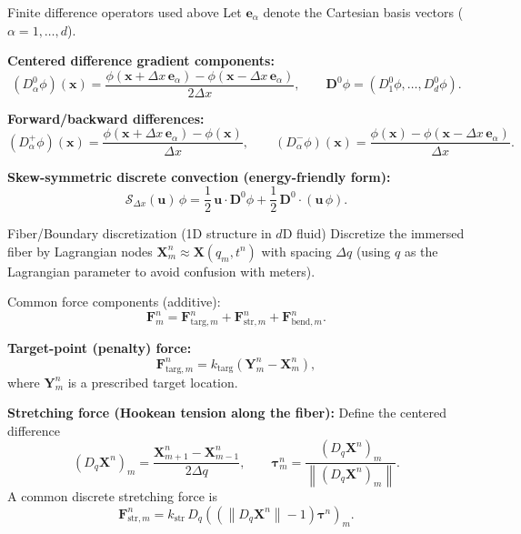 \documentclass{beamer}
\begin{document}
\begin{frame}{Finite difference operators used above}
\small
Let $\mathbf{e}_{\alpha}$ denote the Cartesian basis vectors ($\alpha=1,\dots,d$).

\medskip
\textbf{Centered difference gradient components:}
\[
\left(D_{\alpha}^{0}\phi\right)(\mathbf{x})
=
\frac{\phi(\mathbf{x}+\Delta x\,\mathbf{e}_{\alpha})-\phi(\mathbf{x}-\Delta x\,\mathbf{e}_{\alpha})}{2\Delta x},
\qquad
\mathbf{D}^{0}\phi = (D_{1}^{0}\phi,\dots,D_{d}^{0}\phi).
\]

\textbf{Forward/backward differences:}
\[
\left(D_{\alpha}^{+}\phi\right)(\mathbf{x})
=
\frac{\phi(\mathbf{x}+\Delta x\,\mathbf{e}_{\alpha})-\phi(\mathbf{x})}{\Delta x},
\qquad
\left(D_{\alpha}^{-}\phi\right)(\mathbf{x})
=
\frac{\phi(\mathbf{x})-\phi(\mathbf{x}-\Delta x\,\mathbf{e}_{\alpha})}{\Delta x}.
\]

\textbf{Skew-symmetric discrete convection (energy-friendly form):}
\[
\mathcal{S}_{\Delta x}(\mathbf{u})\,\phi
=
\frac{1}{2}\,\mathbf{u}\cdot \mathbf{D}^{0}\phi
+
\frac{1}{2}\,\mathbf{D}^{0}\cdot(\mathbf{u}\,\phi).
\]
\end{frame}

\begin{frame}{Fiber/Boundary discretization (1D structure in $d$D fluid)}
\small
Discretize the immersed fiber by Lagrangian nodes $\mathbf{X}^{n}_{m}\approx \mathbf{X}(q_m,t^n)$
with spacing $\Delta q$ (using $q$ as the Lagrangian parameter to avoid confusion with meters).

\medskip
Common force components (additive):
\[
\mathbf{F}^{n}_{m}
=
\mathbf{F}^{n}_{\text{targ},m}
+
\mathbf{F}^{n}_{\text{str},m}
+
\mathbf{F}^{n}_{\text{bend},m}.
\]

\textbf{Target-point (penalty) force:}
\[
\mathbf{F}^{n}_{\text{targ},m}
=
k_{\text{targ}}\left(\mathbf{Y}^{n}_{m}-\mathbf{X}^{n}_{m}\right),
\]
where $\mathbf{Y}^{n}_{m}$ is a prescribed target location.

\medskip
\textbf{Stretching force (Hookean tension along the fiber):}
Define the centered difference
\[
\left(D_{q}\mathbf{X}^{n}\right)_m
=
\frac{\mathbf{X}^{n}_{m+1}-\mathbf{X}^{n}_{m-1}}{2\Delta q},
\qquad
\boldsymbol{\tau}^{n}_m
=
\frac{(D_{q}\mathbf{X}^{n})_m}{\left\lVert (D_{q}\mathbf{X}^{n})_m\right\rVert}.
\]
A common discrete stretching force is
\[
\mathbf{F}^{n}_{\text{str},m}
=
k_{\text{str}}\,D_{q}\!\left(\left(\left\lVert D_{q}\mathbf{X}^{n}\right\rVert-1\right)\boldsymbol{\tau}^{n}\right)_m.
\]


\end{frame}
\end{document}

